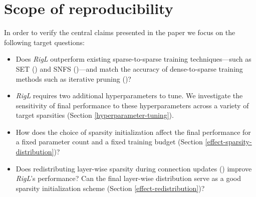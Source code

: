 \section{Scope of reproducibility}
\label{sec:claims}

In order to verify the central claims presented in the paper we focus on the following target questions:

\begin{itemize}
    \item Does \textit{RigL} outperform existing sparse-to-sparse training techniques---such as SET (\citet{Mocanu2018SET}) and SNFS (\citet{dettmers2020sparse})---and match the accuracy of dense-to-sparse training methods such as iterative pruning (\citet{to_prune_or_not})?
    
    \item \textit{RigL} requires two additional hyperparameters to tune. We investigate the sensitivity of final performance to these hyperparameters across a variety of target sparsities (Section \ref{hyperparameter-tuning}).
    
    \item How does the choice of sparsity initialization affect the final performance for a fixed parameter count and a fixed training budget (Section \ref{effect-sparsity-distribution})?
    
    \item Does redistributing layer-wise sparsity during connection updates (\citet{dettmers2020sparse}) improve \textit{RigL}'s performance? Can the final layer-wise distribution serve as a good sparsity initialization scheme (Section \ref{effect-redistribution})? 

\end{itemize}